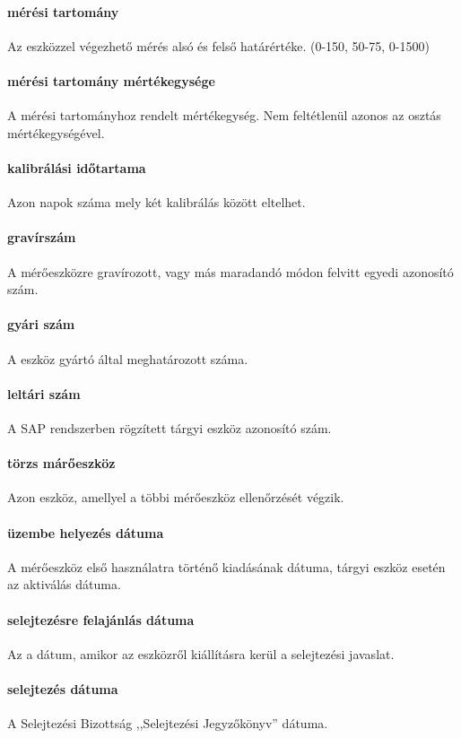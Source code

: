 \paragraph*{mérési tartomány} Az eszközzel végezhető mérés alsó és felső határértéke.
(0-150, 50-75, 0-1500)
\paragraph*{mérési tartomány mértékegysége} A mérési tartományhoz rendelt
mértékegység. Nem feltétlenül azonos az osztás mértékegységével.
\paragraph*{kalibrálási időtartama} Azon napok száma mely két kalibrálás között eltelhet.
\paragraph*{gravírszám} A mérőeszközre gravírozott, vagy más maradandó módon felvitt
egyedi azonosító szám.
\paragraph*{gyári szám} A eszköz gyártó által meghatározott száma.
\paragraph*{leltári szám} A SAP rendszerben rögzített tárgyi eszköz azonosító szám.
\paragraph*{törzs márőeszköz} Azon eszköz, amellyel a többi mérőeszköz ellenőrzését 
végzik.
\paragraph*{üzembe helyezés dátuma} A mérőeszköz első használatra történő 
kiadásának dátuma, tárgyi eszköz esetén az aktiválás dátuma.
\paragraph*{selejtezésre felajánlás dátuma} Az a dátum, amikor az eszközről kiállításra
kerül a selejtezési javaslat.
\paragraph{selejtezés dátuma} A Selejtezési Bizottság ,,Selejtezési Jegyzőkönyv'' 
dátuma.
